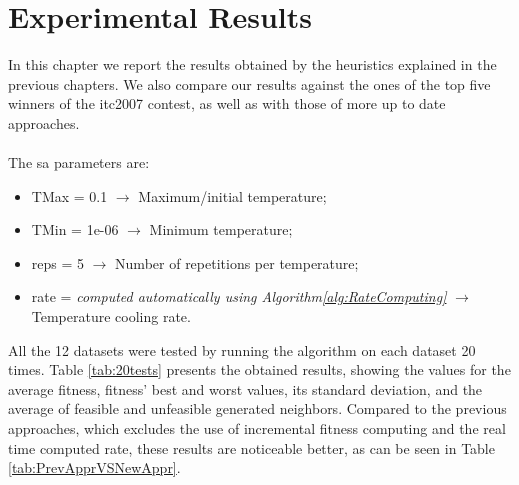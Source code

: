 \chapter{Experimental Results}
\label{chap:ExpResults}

In this chapter we report the results obtained by the heuristics explained in the previous chapters. We also compare our results against the ones of the top five winners of the \gls{itc2007} contest, as well as with those of more up to date approaches.\\
\\
The \gls{sa} parameters are:\\
\begin{itemize}
	\item TMax = 0.1 $\rightarrow$ Maximum/initial temperature;
	
	\item TMin = 1e-06 $\rightarrow$ Minimum temperature;
	
	\item reps = 5 $\rightarrow$ Number of repetitions per temperature;
	
	\item rate = \textit{computed automatically using Algorithm\ref{alg:RateComputing}} $\rightarrow$ Temperature cooling rate.
\\	
\end{itemize}
All the 12 datasets were tested by running the algorithm on each dataset 20 times. Table \ref{tab:20tests} presents the obtained results, showing the values for the average fitness, fitness' best and worst values, its standard deviation, and the average of feasible and unfeasible generated neighbors. Compared to the previous approaches, which excludes the use of incremental fitness computing and the real time computed rate, these results are noticeable better, as can be seen in Table \ref{tab:PrevApprVSNewAppr}. \\
\\
